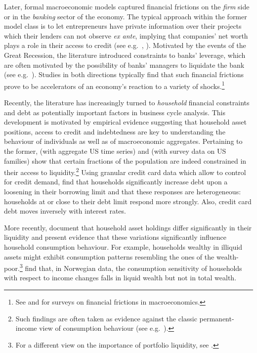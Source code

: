 \documentclass[a4paper,12pt]{article} %
\numberwithin{equation}{section} %
\numberwithin{figure}{section}
\numberwithin{table}{section}
\begin{document}
Later, formal macroeconomic models captured financial frictions on the \textit{firm} side or in the \textit{banking} sector of the economy. The typical approach within the former model class is to let entrepreneurs have private information over their projects which their lenders can not observe \textit{ex ante}, implying that companies' net worth plays a role in their access to credit (see e.g.~\cite{bg1989}, \cite{bgg1999}). Motivated by the events of the Great Recession, the literature introduced constraints to banks' leverage, which are often motivated by the possibility of banks' managers to liquidate the bank (see e.g.~\cite{gertler2011}). Studies in both directions typically find that such financial frictions prove to be accelerators of an economy's reaction to a variety of shocks.\footnote{See \textcite{brunnermeier2012} and \textcite{christiano2022} for surveys on financial frictions in macroeconomics.}

Recently, the literature has increasingly turned to \textit{household} financial constraints and debt as potentially important factors in business cycle analysis. This development is motivated by empirical evidence suggesting that household asset positions, access to credit and indebtedness are key to understanding the behaviour of individuals as well as of macroeconomic aggregates. Pertaining to the former, \textcite{campbell1989} (with aggregate US time series) and \textcite{zeldes1989} (with survey data on US families) show that certain fractions of the population are indeed constrained in their access to liquidity.\footnote{Such findings are often taken as evidence against the classic permanent-income view of consumption behaviour (see e.g.~\cite{kaplan2014}).} Using granular credit card data which allow to control for credit demand, \textcite{gross2002} find that households significantly increase debt upon a loosening in their borrowing limit and that these responses are heterogeneous: households at or close to their debt limit respond more strongly. Also, credit card debt moves inversely with interest rates. 

More recently, \textcite{kaplan2014} document that household asset holdings differ significantly in their liquidity and present evidence that these variations significantly influence household consumption behaviour. For example, households wealthy in illiquid assets might exhibit consumption patterns resembling the ones of the wealth-poor.\footnote{For a different view on the importance of portfolio liquidity, see \textcite{aguiar2020}.} \textcite{fagereng2021mpc} find that, in Norwegian data, the consumption sensitivity of households with respect to income changes falls in liquid wealth but not in total wealth.
\end{document}
